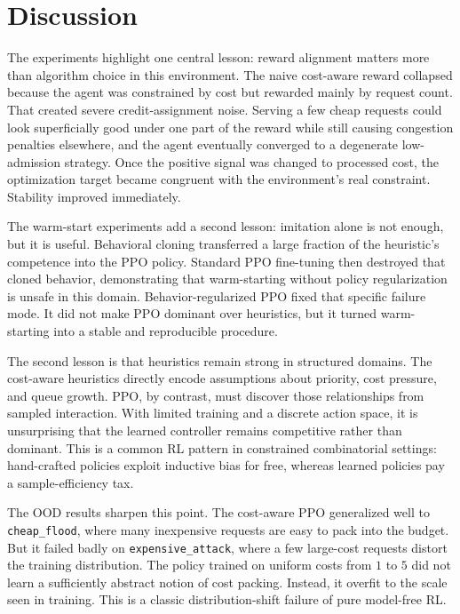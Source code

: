 \documentclass[conference]{IEEEtran}
\begin{document}
\section{Discussion}
The experiments highlight one central lesson: reward alignment matters more than algorithm choice in this environment. The naive cost-aware reward collapsed because the agent was constrained by cost but rewarded mainly by request count. That created severe credit-assignment noise. Serving a few cheap requests could look superficially good under one part of the reward while still causing congestion penalties elsewhere, and the agent eventually converged to a degenerate low-admission strategy. Once the positive signal was changed to processed cost, the optimization target became congruent with the environment's real constraint. Stability improved immediately.

The warm-start experiments add a second lesson: imitation alone is not enough, but it is useful. Behavioral cloning transferred a large fraction of the heuristic's competence into the PPO policy. Standard PPO fine-tuning then destroyed that cloned behavior, demonstrating that warm-starting without policy regularization is unsafe in this domain. Behavior-regularized PPO fixed that specific failure mode. It did not make PPO dominant over heuristics, but it turned warm-starting into a stable and reproducible procedure.

The second lesson is that heuristics remain strong in structured domains. The cost-aware heuristics directly encode assumptions about priority, cost pressure, and queue growth. PPO, by contrast, must discover those relationships from sampled interaction. With limited training and a discrete action space, it is unsurprising that the learned controller remains competitive rather than dominant. This is a common RL pattern in constrained combinatorial settings: hand-crafted policies exploit inductive bias for free, whereas learned policies pay a sample-efficiency tax.

The OOD results sharpen this point. The cost-aware PPO generalized well to \texttt{cheap\_flood}, where many inexpensive requests are easy to pack into the budget. But it failed badly on \texttt{expensive\_attack}, where a few large-cost requests distort the training distribution. The policy trained on uniform costs from $1$ to $5$ did not learn a sufficiently abstract notion of cost packing. Instead, it overfit to the scale seen in training. This is a classic distribution-shift failure of pure model-free RL.
\end{document}

